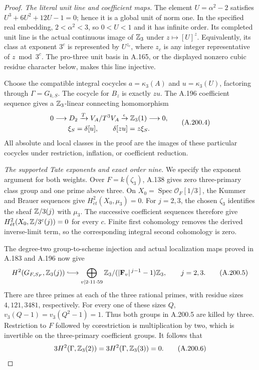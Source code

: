 \begin{proof}
\emph{The literal unit line and coefficient maps.}
The element \(U=\alpha^2-2\) satisfies
\(U^3+6U^2+12U-1=0\); hence it is a global unit of norm
one.  In the specified real embedding, \(2<\alpha^2<3\),
so \(0<U<1\) and it has infinite order.  Its completed
unit line is the actual continuous image of \(\mathbb Z_3\)
under \(z\mapsto[U]^z\).  Equivalently, its class at
exponent \(3^c\) is represented by \(U^{z_c}\), where
\(z_c\) is any integer representative of \(z\bmod3^c\).
The pro-three unit basis in A.165, or the displayed
nonzero cubic residue character below, makes this line
injective.

Choose the compatible integral cocycles
\(a=\kappa_3(A)\) and \(u=\kappa_3(U)\), factoring through
\(\Gamma=G_{k,S}\).  The cocycle for \(B_z\) is exactly
\(zu\).  The A.196 coefficient sequence gives a
\(\mathbb Z_3\)-linear connecting homomorphism
\[
\begin{gathered}
 0\longrightarrow D_2\xrightarrow{T}V_A/T^3V_A
      \xrightarrow{\epsilon}\mathbb Z_3(1)\longrightarrow0,\\
 \xi_S=\delta[u],\qquad
       \delta[zu]=z\xi_S.
\end{gathered}
\tag{A.200.4}
\]
All absolute and local classes in the proof are the
images of these particular cocycles under restriction,
inflation, or coefficient reduction.

\emph{The supported Tate exponents and exact order nine.}
We specify the exponent argument for both weights.
Over \(F=k(\zeta_3)\), A.138 gives zero three-primary
class group and one prime above three.  On
\(X_0=\operatorname{Spec}\mathcal O_F[1/3]\), the Kummer
and Brauer sequences give
\(H^2_{\acute et}(X_0,\mu_3)=0\).  For \(j=2,3\), the
chosen \(\zeta_3\) identifies the sheaf \(\mathbb Z/3(j)\)
with \(\mu_3\).  The successive coefficient sequences
therefore give \(H^2_{\acute et}(X_0,\mathbb Z/3^c(j))=0\)
for every \(c\).  Finite first cohomology removes the
derived inverse-limit term, so the corresponding
integral second cohomology is zero.

The degree-two group-to-scheme injection and actual
localization maps proved in A.183 and A.196 now give
\[
 H^2(G_{F,S_F},\Z_3(j))
   \lhook\joinrel\longrightarrow
 \bigoplus_{v\mid2\cdot11\cdot59}
        \Z_3/(|\mathbf F_v|^{\,j-1}-1)\Z_3,
             \qquad j=2,3.
\tag{A.200.5}
\]
There are three primes at each of the three rational
primes, with residue sizes \(4,121,3481\), respectively.
For every one of these sizes \(Q\),
\(v_3(Q-1)=v_3(Q^2-1)=1\).  Thus both groups in
A.200.5 are killed by three.  Restriction to \(F\)
followed by corestriction is multiplication by two,
which is invertible on the three-primary coefficient
groups.  It follows that
\[
        3H^2(\Gamma,\mathbb Z_3(2))
        =3H^2(\Gamma,\mathbb Z_3(3))=0.
\tag{A.200.6}
\]


\end{proof}
